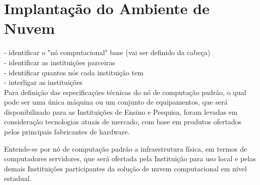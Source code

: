 \documentclass[tese,capa]{texufpel}
\begin{document}

% 

\section{Implantação do Ambiente de Nuvem}

- identificar o "nó computacional" base (vai ser definido da cabeça)\\
- identificar as instituições parceiras\\
- identificar quantos nós cada instituição tem\\
- interligar as instituições\\

Para definição das especificações técnicas do nó de computação padrão, o qual pode ser uma única máquina ou um conjunto de equipamentos, que será disponibilizado para as Instituições de Ensino e Pesquisa, foram levadas em consideração tecnologias atuais de mercado, com base em produtos ofertados pelos principais fabricantes de hardware.

Entende-se por nó de computação padrão a infraestrutura física, em termos de computadores servidores, que será ofertada pela Instituição para uso local e pelas demais Instituições participantes da solução de nuvem computacional em nível estadual.

\end{document}
